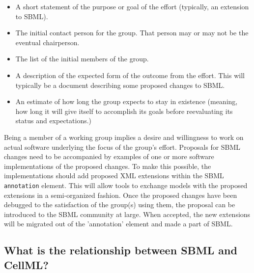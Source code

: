 \documentclass{sbmlfaq}
\begin{document}
\begin{itemize}
   \item A short statement of the purpose or goal of the effort
     (typically, an extension to SBML).

   \item The initial contact person for the group.  That person
     may or may not be the eventual chairperson.

   \item The list of the initial members of the group.

   \item A description of the expected form of the outcome from
     the effort.  This will typically be a document
     describing some proposed changes to SBML.

   \item An estimate of how long the group expects to stay in
     existence (meaning, how long it will give itself to
     accomplish its goals before reevaluating its status and
     expectations.)
\end{itemize}

Being a member of a working group implies a desire and
   willingness to work on actual software underlying the
   focus of the group's effort.  Proposals for SBML changes need
   to be accompanied by examples of one or more software
   implementations of the proposed changes.  To make this
   possible, the implementations should add proposed XML
   extensions within the SBML \texttt{annotation} element.  This
   will allow tools to exchange models with the proposed
   extensions in a semi-organized fashion.  Once the
   proposed changes have been debugged to the satisfaction
   of the group(s) using them, the proposal can be
   introduced to the SBML community at large.  When
   accepted, the new extensions will be migrated out of the
   'annotation' element and made a part of SBML.


\subsection{What is the relationship between SBML and CellML?}
\end{document}
